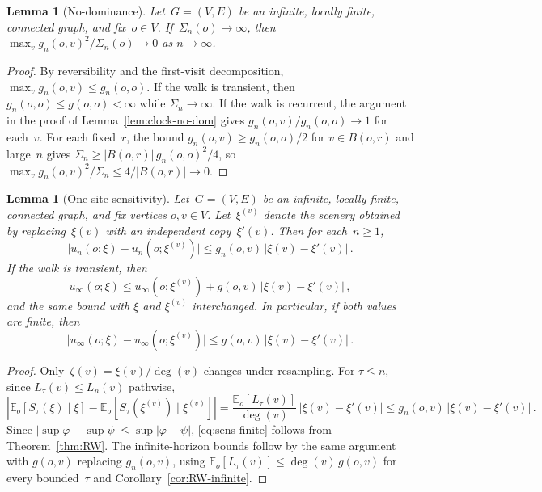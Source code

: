 \documentclass[11pt]{amsart}
\theoremstyle{plain}
\newtheorem{lemma}[theorem]{Lemma}
\theoremstyle{definition}
\newcommand{\E}{\mathbb{E}}
\begin{document}
	\begin{lemma}[No-dominance]\label{lem:no-dominance}
		Let~$G=(V,E)$ be an infinite, locally finite, connected graph, and fix~$o\in V$.
		If~$\Sigma_n(o)\to\infty$, then $\max_{v}g_n(o,v)^2/\Sigma_n(o)\to 0$ as $n\to\infty$.
	\end{lemma}
	\begin{proof}
		By reversibility and the first-visit decomposition, $\max_v g_n(o,v)\leq g_n(o,o)$. If the walk is transient, then $g_n(o,o)\leq g(o,o)<\infty$ while $\Sigma_n\to\infty$. If the walk is recurrent, the argument in the proof of Lemma~\ref{lem:clock-no-dom} gives $g_n(o,v)/g_n(o,o)\to 1$ for each~$v$. For each fixed~$r$, the bound $g_n(o,v)\geq g_n(o,o)/2$ for $v\in B(o,r)$ and large~$n$ gives $\Sigma_n\geq|B(o,r)|\,g_n(o,o)^2/4$, so $\max_v g_n(o,v)^2/\Sigma_n\leq 4/|B(o,r)|\to 0$.
	\end{proof}
	\begin{lemma}[One-site sensitivity]\label{lem:sensitivity}
		Let~$G=(V,E)$ be an infinite, locally finite, connected graph, and fix
		vertices $o, v\in V$. Let~$\xi^{(v)}$ denote the scenery obtained by replacing~$\xi(v)$ with an independent copy~$\xi'(v)$.
		Then for each~$n\geq 1$,
		\begin{equation}\label{eq:sens-finite}
			\bigl|u_n(o;\xi)-u_n(o;\xi^{(v)})\bigr|
			\leq g_n(o,v)\,|\xi(v)-\xi'(v)|\,.
		\end{equation}
		If the walk is transient, then
		\[
		u_\infty(o;\xi)\leq u_\infty(o;\xi^{(v)})+g(o,v)\,|\xi(v)-\xi'(v)|\,,
		\]
		and the same bound with $\xi$ and $\xi^{(v)}$ interchanged. In particular, if both values are finite, then
		\begin{equation}
			\bigl|u_\infty(o;\xi)-u_\infty(o;\xi^{(v)})\bigr|
			\leq g(o,v)\,|\xi(v)-\xi'(v)|\,.
		\end{equation}
	\end{lemma}
	\begin{proof}
		Only~$\zeta(v)=\xi(v)/\deg(v)$ changes under resampling. For $\tau\leq n$, since $L_\tau(v)\leq L_n(v)$ pathwise,
		\[
		\left|\E_o[S_\tau(\xi)\mid\xi]-\E_o[S_\tau(\xi^{(v)})\mid\xi^{(v)}]\right|
		=\frac{\E_o[L_\tau(v)]}{\deg(v)}\,|\xi(v)-\xi'(v)|
		\leq g_n(o,v)\,|\xi(v)-\xi'(v)|\,.
		\]
		Since $|\sup\varphi-\sup\psi|\leq\sup|\varphi-\psi|$, \eqref{eq:sens-finite} follows from Theorem~\ref{thm:RW}. The infinite-horizon bounds follow by the same argument with $g(o,v)$ replacing $g_n(o,v)$, using $\E_o[L_\tau(v)]\leq\deg(v)\,g(o,v)$ for every bounded~$\tau$ and Corollary~\ref{cor:RW-infinite}.
	\end{proof}
	
\end{document}
